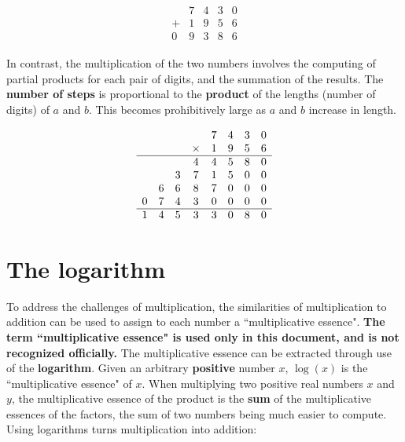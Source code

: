 \documentclass{article}
\begin{document}
\begin{align*}
\begin{array}{ccccc}
    & 7 & 4 & 3 & 0 \\ 
+ & 1 & 9 & 5 & 6 \\ 
\hline
0 & 9 & 3 & 8 & 6
\end{array}
\end{align*}

In contrast, the multiplication of the two numbers involves the computing of partial products for each pair of digits, and the summation of the results. The {\bf number of steps} is proportional to the {\bf product} of the lengths (number of digits) of \(a\) and \(b\). This becomes prohibitively large as \(a\) and \(b\) increase in length.


\begin{align*}
\begin{array}{cccccccc}
& & &            & 7 & 4 & 3 & 0 \\ 
& & & \times & 1 & 9 & 5 & 6 \\ 
\hline
   &    &    & 4 & 4 & 5 & 8 & 0 \\
   &    & 3 & 7 & 1 & 5 & 0 & 0 \\
   & 6 & 6 & 8 & 7 & 0 & 0 & 0 \\
0 & 7 & 4 & 3 & 0 & 0 & 0 & 0 \\
\hline
1 & 4 & 5 & 3 & 3 & 0 & 8 & 0 
\end{array}
\end{align*}



\section*{The logarithm}

To address the challenges of multiplication, the similarities of multiplication to addition can be used to assign to each number a ``multiplicative essence". {\bf The term ``multiplicative essence" is used only in this document, and is not recognized officially.} The multiplicative essence can be extracted through use of the {\bf logarithm}. Given an arbitrary {\bf positive} number \(x\), \(\log(x)\) is the ``multiplicative essence" of \(x\). When multiplying two positive real numbers \(x\) and \(y\), the multiplicative essence of the product is the {\bf sum} of the multiplicative essences of the factors, the sum of two numbers being much easier to compute. Using logarithms turns multiplication into addition:
\end{document}
